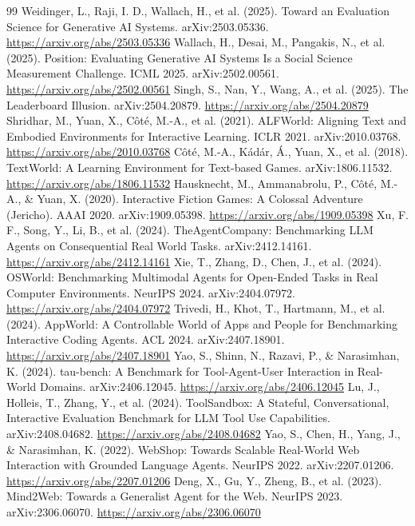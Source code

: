 \begin{thebibliography}{99}
 Weidinger, L., Raji, I. D., Wallach, H., et al. (2025). Toward an Evaluation Science for Generative AI Systems. arXiv:2503.05336. \url{https://arxiv.org/abs/2503.05336}
 Wallach, H., Desai, M., Pangakis, N., et al. (2025). Position: Evaluating Generative AI Systems Is a Social Science Measurement Challenge. ICML 2025. arXiv:2502.00561. \url{https://arxiv.org/abs/2502.00561}
 Singh, S., Nan, Y., Wang, A., et al. (2025). The Leaderboard Illusion. arXiv:2504.20879. \url{https://arxiv.org/abs/2504.20879}
 Shridhar, M., Yuan, X., Côté, M.-A., et al. (2021). ALFWorld: Aligning Text and Embodied Environments for Interactive Learning. ICLR 2021. arXiv:2010.03768. \url{https://arxiv.org/abs/2010.03768}
 Côté, M.-A., Kádár, Á., Yuan, X., et al. (2018). TextWorld: A Learning Environment for Text-based Games. arXiv:1806.11532. \url{https://arxiv.org/abs/1806.11532}
 Hausknecht, M., Ammanabrolu, P., Côté, M.-A., \& Yuan, X. (2020). Interactive Fiction Games: A Colossal Adventure (Jericho). AAAI 2020. arXiv:1909.05398. \url{https://arxiv.org/abs/1909.05398}
 Xu, F. F., Song, Y., Li, B., et al. (2024). TheAgentCompany: Benchmarking LLM Agents on Consequential Real World Tasks. arXiv:2412.14161. \url{https://arxiv.org/abs/2412.14161}
 Xie, T., Zhang, D., Chen, J., et al. (2024). OSWorld: Benchmarking Multimodal Agents for Open-Ended Tasks in Real Computer Environments. NeurIPS 2024. arXiv:2404.07972. \url{https://arxiv.org/abs/2404.07972}
 Trivedi, H., Khot, T., Hartmann, M., et al. (2024). AppWorld: A Controllable World of Apps and People for Benchmarking Interactive Coding Agents. ACL 2024. arXiv:2407.18901. \url{https://arxiv.org/abs/2407.18901}
 Yao, S., Shinn, N., Razavi, P., \& Narasimhan, K. (2024). tau-bench: A Benchmark for Tool-Agent-User Interaction in Real-World Domains. arXiv:2406.12045. \url{https://arxiv.org/abs/2406.12045}
 Lu, J., Holleis, T., Zhang, Y., et al. (2024). ToolSandbox: A Stateful, Conversational, Interactive Evaluation Benchmark for LLM Tool Use Capabilities. arXiv:2408.04682. \url{https://arxiv.org/abs/2408.04682}
 Yao, S., Chen, H., Yang, J., \& Narasimhan, K. (2022). WebShop: Towards Scalable Real-World Web Interaction with Grounded Language Agents. NeurIPS 2022. arXiv:2207.01206. \url{https://arxiv.org/abs/2207.01206}
 Deng, X., Gu, Y., Zheng, B., et al. (2023). Mind2Web: Towards a Generalist Agent for the Web. NeurIPS 2023. arXiv:2306.06070. \url{https://arxiv.org/abs/2306.06070}

\end{thebibliography}
